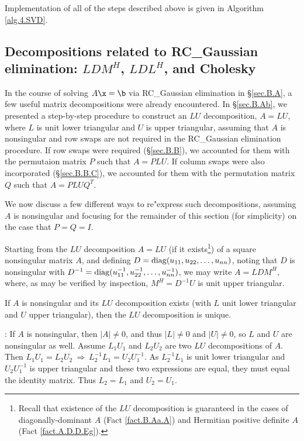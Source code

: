 Implementation of all of the steps described above is given in Algorithm \ref{alg.4.SVD}.

\clearpage
\subsection{Decompositions related to RC_Gaussian elimination: $LDM^{H}$, $LDL^{H}$, and Cholesky}\label{sec.A.D.I}

In the course of solving $A\x=\b$ via RC_Gaussian elimination
in \S \ref{sec.B.A}, a few useful matrix decompositions were already
encountered.  In \S \ref{sec.B.Ab}, we presented a step-by-step
procedure to construct an $LU$ decomposition, $A=LU$, where $L$ is
unit lower triangular and $U$ is upper triangular, assuming that $A$
is nonsingular and row swaps are not required in the RC_Gaussian
elimination procedure.  If row swaps were required (\S \ref{sec.B.B}),
we accounted for them with the permutaion matrix $P$ such that
$A=PLU$.  If column swaps were also incorporated (\S \ref{sec.B.B.C}),
we accounted for them with the permutation matrix $Q$ such that
$A=PLU\!Q^{T}$.

We now discuss a few different ways to re"express such
decompositions, assuming $A$ is nonsingular and focusing for the
remainder of this section (for simplicity) on the case that $P=Q=I$.

Starting from the $LU$ decomposition $A=LU$ (if it
exists\footnote{Recall that existence of the $LU$ decomposition is
guaranteed in the cases of diagonally-dominant $A$ (Fact \ref{fact.B.Aa.A})
and Hermitian positive definite $A$ (Fact \ref{fact.A.D.D.Eg}).}) of a square nonsingular matrix $A$, and
defining $D={\rm diag}(u_{11},u_{22},\ldots,u_{nn})$, noting that $D$
is nonsingular with $D^{-1}={\rm
diag}(u^{-1}_{11},u^{-1}_{22},\ldots,u^{-1}_{nn})$, we may write
$A=LDM^{H}$, where, as may be verified by inspection, $M^{H}=D^{-1}U$
is unit upper triangular.

\begin{fact} \label{fact.B.Aa.Az}
If $A$ is nonsingular and its $LU$ decomposition exists (with $L$ unit lower triangular
and $U$ upper triangular), then the $LU$ decomposition is unique.
\end{fact}

\/: If $A$ is nonsingular, then $|A|\ne 0$, and thus $|L|\ne 0$ and $|U|\ne 0$, so
$L$ and $U$ are nonsingular as well.  Assume $L_{1}U_{1}$ and $L_{2}U_{2}$ are two
$LU$ decompositions of $A$.  Then $L_{1}U_{1}=L_{2}U_{2}\ \Rightarrow\
L_{2}^{-1}L_{1}=U_{2}U_{1}^{-1}$.  As $L_{2}^{-1}L_{1}$ is unit lower
triangular and $U_{2}U_{1}^{-1}$ is upper triangular and these two
expressions are equal, they must equal the identity matrix.  Thus
$L_{2}=L_{1}$ and $U_{2}=U_{1}$.   \endproof \vskip0.1in

